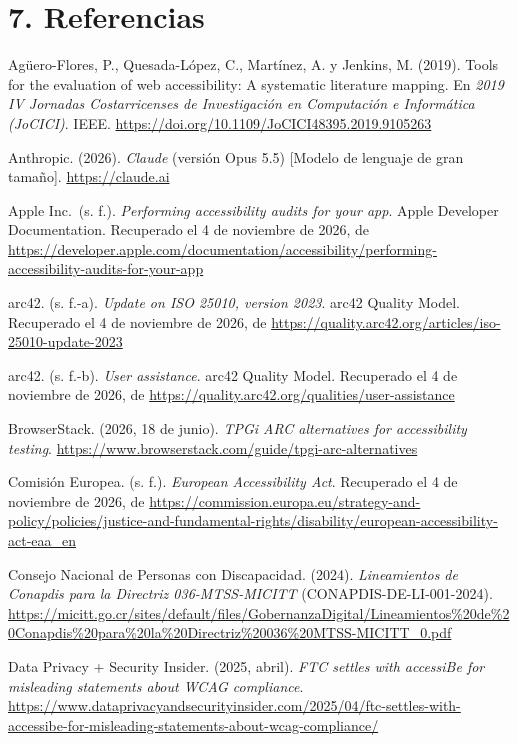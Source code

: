\documentclass[10pt,letterpaper,onecolumn]{IEEEtran}
\begin{document}
\section{7. Referencias}\label{referencias}

Agüero-Flores, P., Quesada-López, C., Martínez, A. y Jenkins, M. (2019). Tools for the evaluation of web accessibility: A systematic literature mapping. En \emph{2019 IV Jornadas Costarricenses de Investigación en Computación e Informática (JoCICI)}. IEEE. \url{https://doi.org/10.1109/JoCICI48395.2019.9105263}

Anthropic. (2026). \emph{Claude} (versión Opus 5.5) {[}Modelo de lenguaje de gran tamaño{]}. \url{https://claude.ai}

Apple Inc.~(s. f.). \emph{Performing accessibility audits for your app}. Apple Developer Documentation. Recuperado el 4 de noviembre de 2026, de \url{https://developer.apple.com/documentation/accessibility/performing-accessibility-audits-for-your-app}

arc42. (s. f.-a). \emph{Update on ISO 25010, version 2023}. arc42 Quality Model. Recuperado el 4 de noviembre de 2026, de \url{https://quality.arc42.org/articles/iso-25010-update-2023}

arc42. (s. f.-b). \emph{User assistance}. arc42 Quality Model. Recuperado el 4 de noviembre de 2026, de \url{https://quality.arc42.org/qualities/user-assistance}

BrowserStack. (2026, 18 de junio). \emph{TPGi ARC alternatives for accessibility testing}. \url{https://www.browserstack.com/guide/tpgi-arc-alternatives}

Comisión Europea. (s. f.). \emph{European Accessibility Act}. Recuperado el 4 de noviembre de 2026, de \url{https://commission.europa.eu/strategy-and-policy/policies/justice-and-fundamental-rights/disability/european-accessibility-act-eaa_en}

Consejo Nacional de Personas con Discapacidad. (2024). \emph{Lineamientos de Conapdis para la Directriz 036-MTSS-MICITT} (CONAPDIS-DE-LI-001-2024). \url{https://micitt.go.cr/sites/default/files/GobernanzaDigital/Lineamientos\%20de\%20Conapdis\%20para\%20la\%20Directriz\%20036\%20MTSS-MICITT_0.pdf}

Data Privacy + Security Insider. (2025, abril). \emph{FTC settles with accessiBe for misleading statements about WCAG compliance}. \url{https://www.dataprivacyandsecurityinsider.com/2025/04/ftc-settles-with-accessibe-for-misleading-statements-about-wcag-compliance/}
\end{document}
